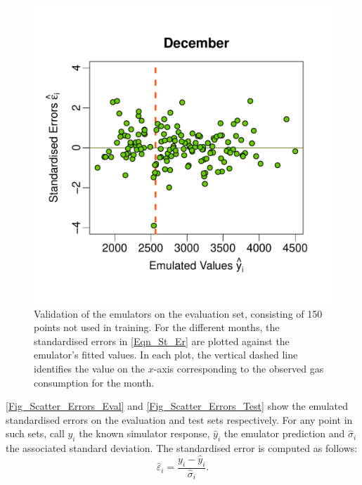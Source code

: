 \documentclass[a4paper, 12pt]{article}
\newcommand{\eps}{\varepsilon}
\begin{document}
\begin{figure}
 \includegraphics[width=\scale]{Validation_Plots/Evaluation_Set/Evaluation_Scatter_12_Dec}
 \caption{Validation of the emulators on the evaluation set, consisting of 150 points not used in training. For the different months, the standardised errors in \eqref{Eqn_St_Er} are plotted against the emulator's fitted values. In each plot, the vertical dashed line identifies the value on the $x$-axis corresponding to the observed gas consumption for the month.}
 \label{Fig_Scatter_Errors_Eval}
\end{figure}


\autoref{Fig_Scatter_Errors_Eval} and \autoref{Fig_Scatter_Errors_Test} show the emulated standardised errors on the evaluation and test sets respectively. For any point in such sets, call $y_i$ the known simulator response, $\hat{y}_i$ the emulator prediction and $\hat{\sigma}_i$ the associated standard deviation. The standardised error is computed as follows:
\begin{equation}\label{Eqn_St_Er}
\hat{\eps}_i = \frac{y_i - \hat{y}_i}{\hat \sigma_i}.
\end{equation}
\end{document}
